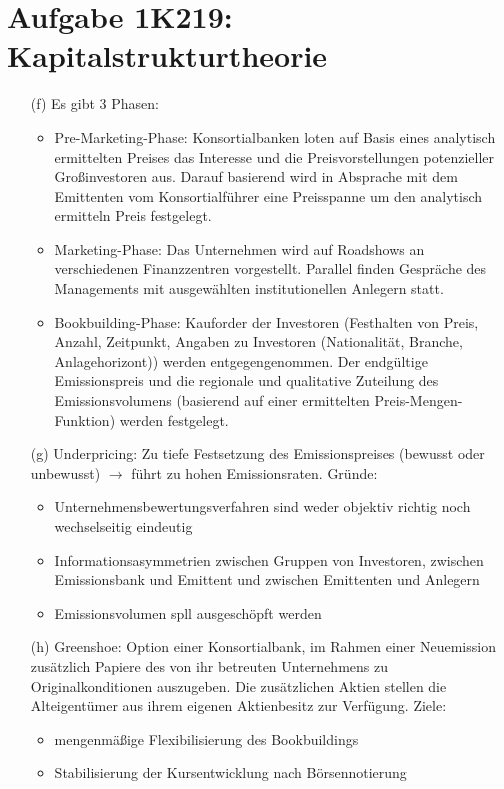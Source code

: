 \documentclass{article}
\begin{document}
	\section*{Aufgabe 1K219: Kapitalstrukturtheorie}
	\begin{itemize}
		\item[(f)] Es gibt 3 Phasen:
		\begin{itemize}
			\item Pre-Marketing-Phase: Konsortialbanken loten auf Basis eines analytisch ermittelten Preises das Interesse und die Preisvorstellungen potenzieller Großinvestoren aus. Darauf basierend wird in Absprache mit dem Emittenten vom Konsortialführer eine Preisspanne um den analytisch ermitteln Preis festgelegt.
			\item Marketing-Phase: Das Unternehmen wird auf Roadshows an verschiedenen Finanzzentren vorgestellt. Parallel finden Gespräche des Managements mit ausgewählten institutionellen Anlegern statt.
			\item Bookbuilding-Phase: Kauforder der Investoren (Festhalten von Preis, Anzahl, Zeitpunkt, Angaben zu Investoren (Nationalität, Branche, Anlagehorizont)) werden entgegengenommen. Der endgültige Emissionspreis und die regionale und qualitative Zuteilung des Emissionsvolumens (basierend auf einer ermittelten Preis-Mengen-Funktion) werden festgelegt.
		\end{itemize}
		\item[(g)] Underpricing: Zu tiefe Festsetzung des Emissionspreises (bewusst oder unbewusst) $\to$ führt zu hohen Emissionsraten. Gründe:
		\begin{itemize}
			\item Unternehmensbewertungsverfahren sind weder objektiv richtig noch wechselseitig eindeutig
			\item Informationsasymmetrien zwischen Gruppen von Investoren, zwischen Emissionsbank und Emittent und zwischen Emittenten und Anlegern
			\item Emissionsvolumen spll ausgeschöpft werden
		\end{itemize}
		\item[(h)] Greenshoe: Option einer Konsortialbank, im Rahmen einer Neuemission zusätzlich Papiere des von ihr betreuten Unternehmens zu Originalkonditionen auszugeben. Die zusätzlichen Aktien stellen die Alteigentümer aus ihrem eigenen Aktienbesitz zur Verfügung. Ziele:
		\begin{itemize}
			\item mengenmäßige Flexibilisierung des Bookbuildings
			\item Stabilisierung der Kursentwicklung nach Börsennotierung
		\end{itemize}
	\end{itemize}
\end{document}
